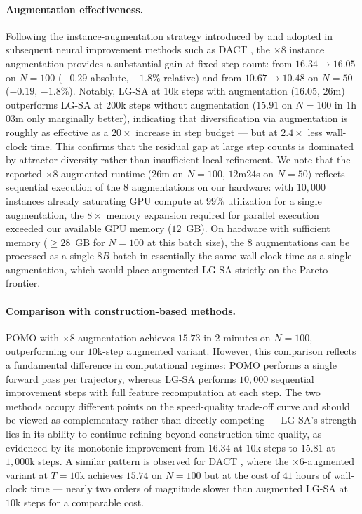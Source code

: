 \documentclass[letterpaper]{article} %
\begin{document}
\paragraph{Augmentation effectiveness.}
Following the instance-augmentation strategy introduced by \citet{kwon_pomo_2021} and adopted in subsequent neural improvement methods such as DACT \citep{ma_learning_2021}, the $\times 8$ instance augmentation provides a substantial gain at fixed step count: from $16.34 \to 16.05$ on $N{=}100$ ($-0.29$ absolute, $-1.8\%$ relative) and from $10.67 \to 10.48$ on $N{=}50$ ($-0.19$, $-1.8\%$). Notably, LG-SA at $10$k steps with augmentation ($16.05$, $26$m) outperforms LG-SA at $200$k steps without augmentation ($15.91$ on $N{=}100$ in $1$h$03$m only marginally better), indicating that diversification via augmentation is roughly as effective as a $20\times$ increase in step budget --- but at $2.4\times$ less wall-clock time. This confirms that the residual gap at large step counts is dominated by attractor diversity rather than insufficient local refinement. We note that the reported $\times 8$-augmented runtime ($26$m on $N{=}100$, $12$m$24$s on $N{=}50$) reflects sequential execution of the $8$ augmentations on our hardware: with $10{,}000$ instances already saturating GPU compute at $99\%$ utilization for a single augmentation, the $8\times$ memory expansion required for parallel execution exceeded our available GPU memory ($12$~GB). On hardware with sufficient memory ($\geq 28$~GB for $N{=}100$ at this batch size), the $8$ augmentations can be processed as a single $8B$-batch in essentially the same wall-clock time as a single augmentation, which would place augmented LG-SA strictly on the Pareto frontier.
 
\paragraph{Comparison with construction-based methods.}
POMO \citep{kwon_pomo_2021} with $\times 8$ augmentation achieves $15.73$ in $2$ minutes on $N{=}100$, outperforming our $10$k-step augmented variant. However, this comparison reflects a fundamental difference in computational regimes: POMO performs a single forward pass per trajectory, whereas LG-SA performs $10{,}000$ sequential improvement steps with full feature recomputation at each step. The two methods occupy different points on the speed-quality trade-off curve and should be viewed as complementary rather than directly competing --- LG-SA's strength lies in its ability to continue refining beyond construction-time quality, as evidenced by its monotonic improvement from $16.34$ at $10$k steps to $15.81$ at $1{,}000$k steps. A similar pattern is observed for DACT \citep{ma_learning_2021}, where the $\times 6$-augmented variant at $T{=}10$k achieves $15.74$ on $N{=}100$ but at the cost of $41$ hours of wall-clock time --- nearly two orders of magnitude slower than augmented LG-SA at $10$k steps for a comparable cost.
 
\end{document}
